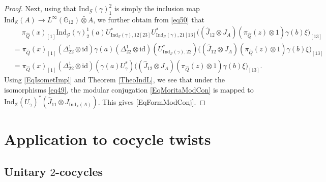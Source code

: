 \documentclass[reqno]{amsart}
\numberwithin{equation}{section}
\newcommand{\id}{\mathrm{id}}
\newcommand{\G}{\mathbb{G}}
\newcommand{\X}{\mathbb{X}}
\newcommand{\msG}{\mathscr{G}}
\newcommand{\Ind}{\mathrm{Ind}}
\begin{document}
\begin{proof}
Next, using that $\Ind_{\msG}(\gamma)^2_1$ is simply the inclusion map $\Ind_{\X}(A)\rightarrow L^{\infty}(\G_{12})\bar\otimes A$, we further obtain from \eqref{eq50} that
\[\begin{split}
&\quad\;
\pi_{\hat{Q}}(x)_{[1]}
\Ind_{\msG}(\gamma)_2^1 (a)
U^*_{\Ind_{\msG}(\gamma),12 [23]}
U^*_{\Ind_{\msG}(\gamma),21[13]}
\bigl(
(\hat{J}_{12}\otimes J_A)
(\pi_{\hat{Q}}(z)\otimes 1)
\gamma(b) \xi
\bigr)_{[13]}\\
&=
\pi_{\hat{Q}}(x)_{[1]}
(\Delta^1_{22}\otimes \id)\gamma(a)
(\Delta_{22}^1\otimes \id)(U^*_{\Ind_{\msG}(\gamma),22})
\bigl(
(\hat{J}_{12}\otimes J_A)
(\pi_{\hat{Q}}(z)\otimes 1)
\gamma(b) \xi
\bigr)_{[13]}\\
&=
\pi_{\hat{Q}}(x)_{[1]}
(\Delta^1_{22}\otimes \id)(\gamma(a)
U^*_{\gamma})
\bigl(
(\hat{J}_{12}\otimes J_A)
(\pi_{\hat{Q}}(z)\otimes 1)
\gamma(b) \xi
\bigr)_{[13]}.
\end{split}\]
Using \eqref{EqIsometImpl} and Theorem \ref{TheoIndL}, we see that under the isomorphisms \eqref{eq49}, the modular conjugation \eqref{EqMoritaModCon} is mapped to $\Ind_{\X}(U_{\gamma})^*(\hat{J}_{11}\otimes J_{\Ind_{\X}(A)})$. This gives \eqref{EqFormModConj}.
\end{proof}



\section{Application to cocycle twists}\label{SecCocyc}

\subsection{Unitary \texorpdfstring{$2$}{2}-cocycles}
\end{document}
